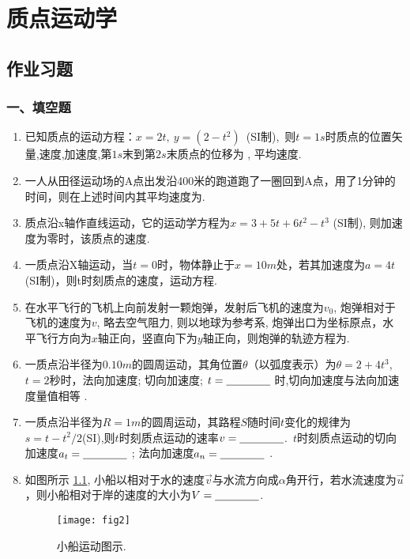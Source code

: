 \chapter{质点运动学}
\section{作业习题}
\subsection*{一、填空题}
\begin{enumerate}
    \item 已知质点的运动方程：$x =2t,\ y =(2-t^2)$\ (SI制),\ 则$t=1s$时质点的位置矢量\nl,速度\nl ,加速度\nl,第$1s$末到第$2s$末质点的位移为
    \nl, 平均速度\nl .
    \item 一人从田径运动场的A点出发沿400米的跑道跑了一圈回到A点，用了1分钟的时间，则在上述时间内其平均速度为\nl .
    \item 质点沿x轴作直线运动，它的运动学方程为$x = 3+5t+6t^2-t^3$ (SI制), 则加速度为零时，该质点的速度\nl .
    \item 一质点沿X轴运动，当$t=0$时，物体静止于$x=10m$处，若其加速度为$a=4t$(SI制)，则t时刻质点的速度\nl，运动方程\nl .
    \item 在水平飞行的飞机上向前发射一颗炮弹，发射后飞机的速度为$v_0$, 炮弹相对于飞机的速度为$v$, 略去空气阻力, 则以地球为参考系, 炮弹出口为坐标原点，水平飞行方向为$x$轴正向，竖直向下为$y$轴正向，则炮弹的轨迹方程为\nl .
    \item 一质点沿半径为$0.10m$的圆周运动，其角位置$\theta$（以弧度表示）为$\theta=2+4t^3$,\ $t=2$秒时，法向加速度\nl; 切向加速度\nl; $t = \nl$ 时,切向加速度与法向加速度量值相等 .
    \item 一质点沿半径为$R=1m$的圆周运动，其路程$S$随时间$t$变化的规律为$s=t-t^2/2$(SI),则$t$时刻质点运动的速率$v=\nl$.\ $t$时刻质点运动的切向加速度$a_t=\nl$ ; 法向加速度$a_n=\nl$ .
    \item 如图所示 \ref{fig:2}, 小船以相对于水的速度$\vec{v}$与水流方向成$\alpha$角开行，若水流速度为$\vec{u}$，则小船相对于岸的速度的大小为$V=\nl$.
    \begin{figure}[h]
        \centering
        \texttt{[image: fig2]}
        \caption{小船运动图示.}\label{fig:2}
    \end{figure}
\end{enumerate}
